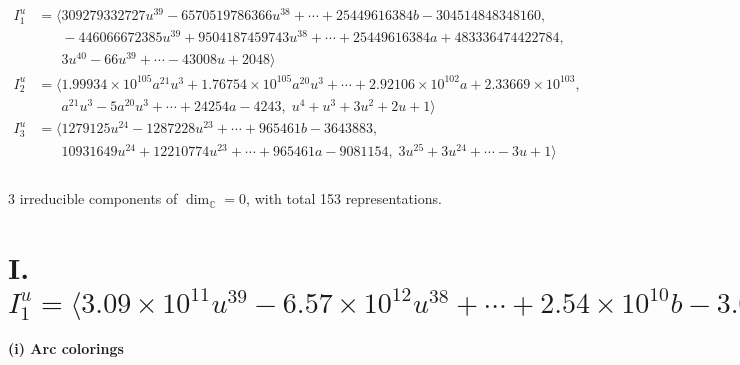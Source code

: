 \documentclass[1p]{elsarticle_modified}
\theoremstyle{definition}
\begin{document}
\begin{align*}
I^u_{1}&=\langle 
309279332727 u^{39}-6570519786366 u^{38}+\cdots+25449616384 b-304514848348160,\\
\phantom{I^u_{1}}&\phantom{= \langle  }-446066672385 u^{39}+9504187459743 u^{38}+\cdots+25449616384 a+483336474422784,\\
\phantom{I^u_{1}}&\phantom{= \langle  }3 u^{40}-66 u^{39}+\cdots-43008 u+2048\rangle \\
I^u_{2}&=\langle 
1.99934\times10^{105} a^{21} u^{3}+1.76754\times10^{105} a^{20} u^{3}+\cdots+2.92106\times10^{102} a+2.33669\times10^{103},\\
\phantom{I^u_{2}}&\phantom{= \langle  }a^{21} u^3-5 a^{20} u^3+\cdots+24254 a-4243,\;u^4+u^3+3 u^2+2 u+1\rangle \\
I^u_{3}&=\langle 
1279125 u^{24}-1287228 u^{23}+\cdots+965461 b-3643883,\\
\phantom{I^u_{3}}&\phantom{= \langle  }10931649 u^{24}+12210774 u^{23}+\cdots+965461 a-9081154,\;3 u^{25}+3 u^{24}+\cdots-3 u+1\rangle \\
\\
\end{align*}
\raggedright * 3 irreducible components of $\dim_{\mathbb{C}}=0$, with total 153 representations.\\
\newpage
\renewcommand{\arraystretch}{1}
\centering \section*{I. $I^u_{1}= \langle 3.09\times10^{11} u^{39}-6.57\times10^{12} u^{38}+\cdots+2.54\times10^{10} b-3.05\times10^{14},\;-4.46\times10^{11} u^{39}+9.50\times10^{12} u^{38}+\cdots+2.54\times10^{10} a+4.83\times10^{14},\;3 u^{40}-66 u^{39}+\cdots-43008 u+2048 \rangle$}
\flushleft \textbf{(i) Arc colorings}\\
\end{document}
